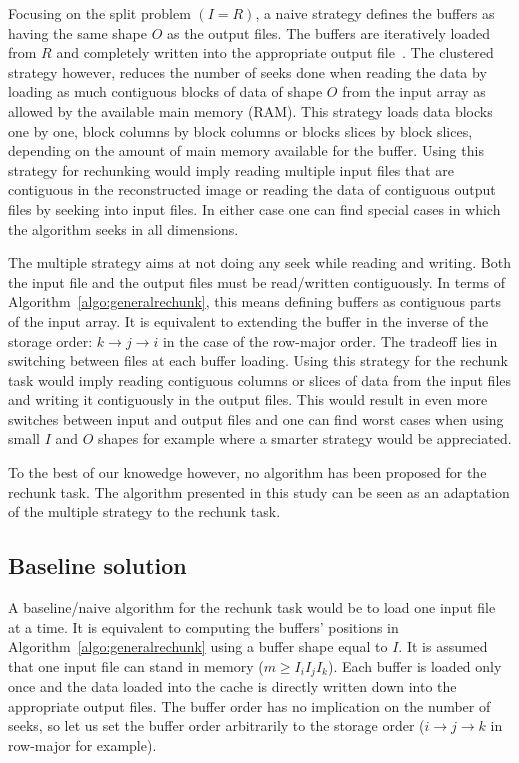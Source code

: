 \documentclass[conference]{IEEEtran}
\begin{document}
Focusing on the split problem $(I=R)$, a naive strategy defines the buffers as
having the same shape $O$ as the output files. The buffers are iteratively
loaded from $R$ and completely written into the appropriate output
file~\cite{seqalgorithms}. The clustered strategy however, reduces the number of
seeks done when reading the data by loading as much contiguous blocks of data
of shape $O$ from the input array as allowed by the available main memory (RAM).
This strategy loads data blocks one by one, block columns by block columns or
blocks slices by block slices, depending on the amount of main memory available
for the buffer. Using this strategy for rechunking would imply reading multiple
input files that are contiguous in the reconstructed image or reading the data
of contiguous output files by seeking into input files. In either case one can
find special cases in which the algorithm seeks in all dimensions.

The multiple strategy aims at not doing any seek while reading and writing.
Both the input file and the output files must be read/written contiguously. In
terms of Algorithm~\ref{algo:generalrechunk}, this means defining buffers as
contiguous parts of the input array. It is equivalent to extending the buffer
in the inverse of the storage order: $k \rightarrow j \rightarrow i$ in the case
of the row-major order. The tradeoff lies in switching between files
at each buffer loading. Using this strategy for the rechunk task would imply
reading contiguous columns or slices of data from the input files and writing it
contiguously in the output files. This would result in even more switches
between input and output files and one can find worst cases when using small
$I$ and $O$ shapes for example where a smarter strategy would be appreciated.

To the best of our knowedge however, no algorithm has been proposed for the
rechunk task. The algorithm presented in this study can be seen as an
adaptation of the multiple strategy to the rechunk task.

\subsection{Baseline solution}

A baseline/naive algorithm for the rechunk task would be to load one input file
at a time. It is equivalent to computing the buffers' positions in
Algorithm~\ref{algo:generalrechunk} using a buffer shape equal to $I$.
It is assumed that one input file can stand in memory ($m \geq I_iI_jI_k$). Each
buffer is loaded only once and the data loaded into the cache is directly
written down into the appropriate output files. The buffer order has no
implication on the number of seeks, so let us set the buffer order arbitrarily
to the storage order ($i \rightarrow j \rightarrow k$ in row-major for example).
\end{document}
